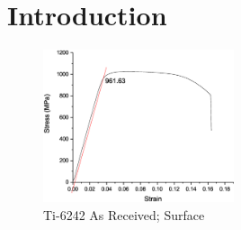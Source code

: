 \chapter{Introduction}

\begin{figure}[H]
    \centering
        \includegraphics[width=0.50\textwidth]{test/images/Ti6242-1.5-TS-Graph}
        \caption{Ti-6242 As Received; Surface}
    \label{fig:EDM-Cut}
\end{figure}
